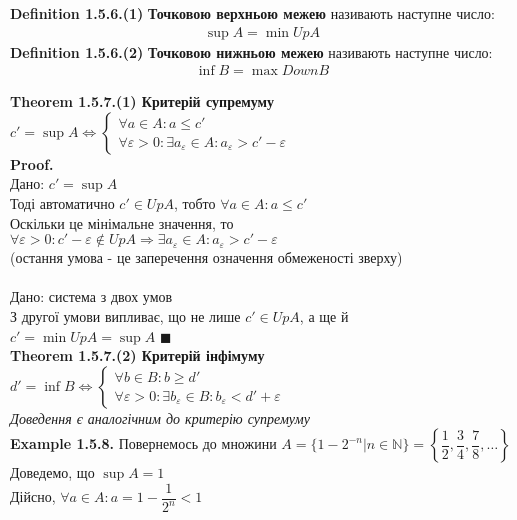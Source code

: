 \documentclass[a4paper, 14pt]{extarticle}
\def\bigline{\vspace{5mm}\\}
\def\ex#1{\textbf{Example {#1}}}
\def\bigline{\vspace{5mm}\\}
\def\qed{$\blacksquare$}
\begin{document}
	\textbf{Definition 1.5.6.(1)} \textbf{Точковою верхньою межею} називають наступне число:
	\begin{align*}
	\sup A = \min UpA
	\end{align*}
	\textbf{Definition 1.5.6.(2)} \textbf{Точковою нижньою межею} називають наступне число:
	\begin{align*}
	\inf B = \max DownB
	\end{align*}
	
	\textbf{Theorem 1.5.7.(1) Критерій супремуму}\\
	$c' = \sup A \iff \begin{cases} 
	 \forall a \in A: a \leq c' \\
	 \forall \varepsilon > 0: \exists a_{\varepsilon} \in A: a_{\varepsilon} > c' - \varepsilon
	\end{cases}$\\
	\textbf{Proof.}\\
	\boxed{\Rightarrow} Дано: $c' = \sup A$\\
	Тоді автоматично $c' \in UpA$, тобто $\forall a \in A: a \leq c'$\\
	Оскільки це мінімальне значення, то\\ $\forall \varepsilon > 0: c' - \varepsilon \notin UpA \Rightarrow \exists a_{\varepsilon} \in A: a_{\varepsilon} > c' - \varepsilon$\\
	(остання умова - це заперечення означення обмеженості зверху)
	\\
	\\
	\boxed{\Leftarrow} Дано: система з двох умов\\
	З другої умови випливає, що не лише $c' \in UpA$, а ще й\\$c' = \min UpA = \sup A$ \qed
	\bigline
	\textbf{Theorem 1.5.7.(2) Критерій інфімуму}\\
	$d' = \inf B \iff \begin{cases} 
	 \forall b \in B: b \geq d'\\
	 \forall \varepsilon > 0: \exists b_{\varepsilon} \in B: b_{\varepsilon} < d' + \varepsilon
	\end{cases}$\\
	\textit{Доведення є аналогічним до критерію супремуму}
	\bigline
	\ex{1.5.8.} Повернемось до множини $A = \{1-2^{-n} | n \in \mathbb{N}\} = \left\{\dfrac{1}{2}, \dfrac{3}{4}, \dfrac{7}{8}, \dots \right\}$\\
	Доведемо, що $\sup A = 1$\\
	Дійсно, $\forall a \in A: a = 1 - \dfrac{1}{2^n} < 1$\\
\end{document}
